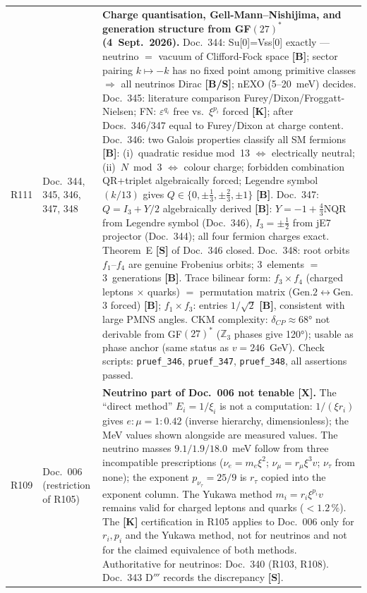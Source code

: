 \begin{longtable}{@{}p{0.9cm}p{3.1cm}p{10.2cm}@{}}
R111 & Doc.~344, 345, 346, 347, 348 & \textbf{Charge quantisation, Gell-Mann--Nishijima, and generation structure from GF$(27)^*$ (4~Sept.~2026).} Doc.~344: Su[0]=Vss[0] exactly --- neutrino $=$ vacuum of Clifford-Fock space \textbf{[B]}; sector pairing $k\mapsto-k$ has no fixed point among primitive classes $\Rightarrow$ all neutrinos Dirac \textbf{[B/S]}; nEXO (5--20~meV) decides. Doc.~345: literature comparison Furey/Dixon/Froggatt-Nielsen; FN: $\varepsilon^{q_i}$ free vs.\ $\xi^{p_i}$ forced \textbf{[K]}; after Docs.~346/347 equal to Furey/Dixon at charge content. Doc.~346: two Galois properties classify all SM fermions \textbf{[B]}: (i)~quadratic residue mod~13 $\Leftrightarrow$ electrically neutral; (ii)~$N\bmod3$ $\Leftrightarrow$ colour charge; forbidden combination QR+triplet algebraically forced; Legendre symbol $(k/13)$ gives $Q\in\{0,\pm\tfrac{1}{3},\pm\tfrac{2}{3},\pm1\}$ \textbf{[B]}. Doc.~347: $Q=I_3+Y/2$ algebraically derived \textbf{[B]}: $Y=-1+\tfrac{4}{3}\mathrm{NQR}$ from Legendre symbol (Doc.~346), $I_3=\pm\tfrac{1}{2}$ from jE7 projector (Doc.~344); all four fermion charges exact. Theorem~E \textbf{[S]} of Doc.~346 closed. Doc.~348: root orbits $f_1$--$f_4$ are genuine Frobenius orbits; 3~elements $=$ 3~generations \textbf{[B]}. Trace bilinear form: $f_3\times f_4$ (charged leptons $\times$ quarks) $=$ permutation matrix (Gen.$2\leftrightarrow$Gen.$3$ forced) \textbf{[B]}; $f_1\times f_3$: entries $1/\sqrt{2}$ \textbf{[B]}, consistent with large PMNS angles. CKM complexity: $\delta_{CP}\approx68°$ not derivable from GF$(27)^*$ ($\mathbb{Z}_3$ phases give 120°); usable as phase anchor (same status as $v=246$~GeV). Check scripts: \texttt{pruef\_346}, \texttt{pruef\_347}, \texttt{pruef\_348}, all assertions passed. \\
R109 & Doc.~006 (restriction of R105) & \textbf{Neutrino part of Doc.~006 not tenable [X].} The ``direct method'' $E_i=1/\xi_i$ is not a computation: $1/(\xi r_i)$ gives $e{:}\mu = 1{:}0.42$ (inverse hierarchy, dimensionless); the MeV values shown alongside are measured values. The neutrino masses $9.1/1.9/18.0$~meV follow from three incompatible prescriptions ($\nu_e=m_e\xi^2$; $\nu_\mu=r_\mu\xi^3 v$; $\nu_\tau$ from none); the exponent $p_{\nu_\tau}=25/9$ is $r_\tau$ copied into the exponent column. The Yukawa method $m_i=r_i\xi^{p_i}v$ remains valid for charged leptons and quarks ($<1.2\,\%$). The \textbf{[K]} certification in R105 applies to Doc.~006 only for $r_i,p_i$ and the Yukawa method, not for neutrinos and not for the claimed equivalence of both methods. Authoritative for neutrinos: Doc.~340 (R103, R108). Doc.~343 D$'''$ records the discrepancy \textbf{[S]}. \\

\end{longtable}
